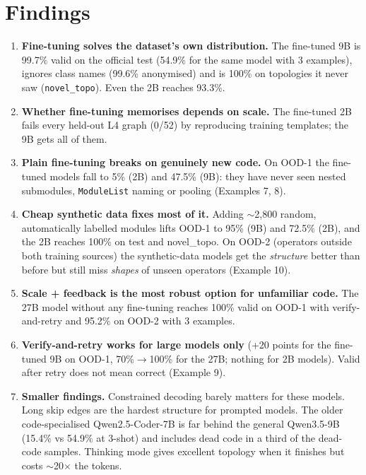 \documentclass[11pt,a4paper]{article}
\begin{document}
\section{Findings}\label{sec:findings}
\begin{enumerate}[leftmargin=*]
\item \textbf{Fine-tuning solves the dataset's own distribution.} The fine-tuned 9B is 99.7\% valid on the official
test (54.9\% for the same model with 3 examples), ignores class names (99.6\% anonymised) and is 100\% on topologies it
never saw (\texttt{novel\_topo}). Even the 2B reaches 93.3\%.
\item \textbf{Whether fine-tuning memorises depends on scale.} The fine-tuned 2B fails every held-out L4 graph (0/52)
by reproducing training templates; the 9B gets all of them.
\item \textbf{Plain fine-tuning breaks on genuinely new code.} On OOD-1 the fine-tuned models fall to 5\% (2B) and
47.5\% (9B): they have never seen nested submodules, \texttt{ModuleList} naming or pooling (Examples 7, 8).
\item \textbf{Cheap synthetic data fixes most of it.} Adding $\sim$2{,}800 random, automatically labelled modules lifts
OOD-1 to 95\% (9B) and 72.5\% (2B), and the 2B reaches 100\% on test and novel\_topo. On OOD-2 (operators outside both
training sources) the synthetic-data models get the \emph{structure} better than before but still miss \emph{shapes}
of unseen operators (Example 10).
\item \textbf{Scale + feedback is the most robust option for unfamiliar code.} The 27B model without any fine-tuning
reaches 100\% valid on OOD-1 with verify-and-retry and 95.2\% on OOD-2 with 3 examples.
\item \textbf{Verify-and-retry works for large models only} (+20 points for the fine-tuned 9B on OOD-1, 70\%$\to$100\% for
the 27B; nothing for 2B models). Valid after retry does not mean correct (Example 9).
\item \textbf{Smaller findings.} Constrained decoding barely matters for these models. Long skip edges are the
hardest structure for prompted models. The older code-specialised Qwen2.5-Coder-7B is far behind the general
Qwen3.5-9B (15.4\% vs 54.9\% at 3-shot) and includes dead code in a third of the dead-code samples. Thinking mode gives
excellent topology when it finishes but costs $\sim$20$\times$ the tokens.
\end{enumerate}
\end{document}
